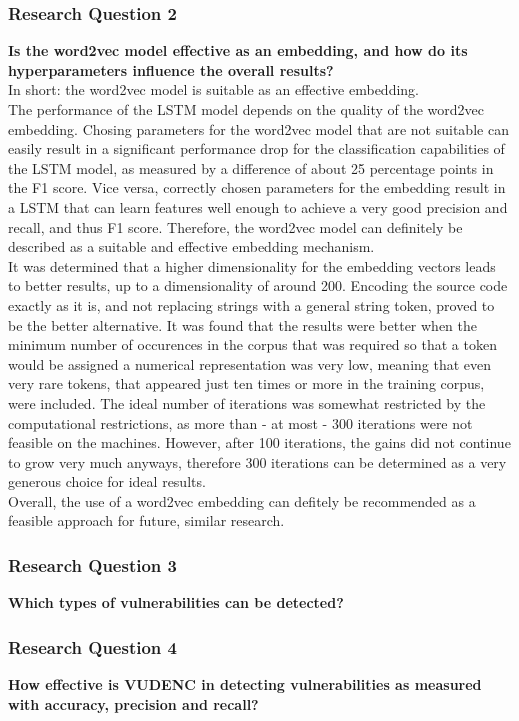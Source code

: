 \documentclass[
	a4paper,
	pagesize,
	pdftex,
	12pt,
	twoside, %
	BCOR=5mm, %
	ngerman,
	fleqn,
	final,
	]{scrartcl}
\begin{document}
\subsubsection{Research Question 2}
\textbf{Is the word2vec model effective as an embedding, and how do its hyperparameters influence the overall results?}\\
In short: the word2vec model is suitable as an effective embedding.\\
The performance of the LSTM model depends on the quality of the word2vec embedding. Chosing parameters for the word2vec model that are not suitable can easily result in a significant performance drop for the classification capabilities of the LSTM model, as measured by a difference of about 25 percentage points in the F1 score. Vice versa, correctly chosen parameters for the embedding result in a LSTM that can learn features well enough to achieve a very good precision and recall, and thus F1 score. Therefore, the word2vec model can definitely be described as a suitable and effective embedding mechanism.\\
It was determined that a higher dimensionality for the embedding vectors leads to better results, up to a dimensionality of around 200. Encoding the source code exactly as it is, and not replacing strings with a general string token, proved to be the better alternative. It was found that the results were better when the minimum number of occurences in the corpus that was required so that a token would be assigned a numerical representation was very low, meaning that even very rare tokens, that appeared just ten times or more in the training corpus, were included. The ideal number of iterations was somewhat restricted by the computational restrictions, as more than - at most - 300 iterations were not feasible on the machines. However, after 100 iterations, the gains did not continue to grow very much anyways, therefore 300 iterations can be determined as a very generous choice for ideal results.\\
Overall, the use of a word2vec embedding can defitely be recommended as a feasible approach for future, similar research. 

\subsubsection{Research Question 3}
\textbf{Which types of vulnerabilities can be detected?}

\subsubsection{Research Question 4}
\textbf{How effective is VUDENC in detecting vulnerabilities as measured with accuracy, precision and recall? }
\end{document}
